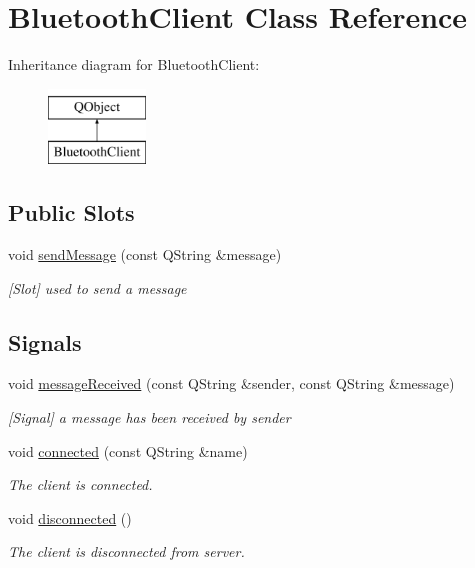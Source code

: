 \hypertarget{classBluetoothClient}{}\section{Bluetooth\+Client Class Reference}
\label{classBluetoothClient}
Inheritance diagram for Bluetooth\+Client\+:\begin{figure}[H]
\begin{center}
\leavevmode
\includegraphics[height=2.000000cm]{classBluetoothClient}
\end{center}
\end{figure}
\subsection*{Public Slots}
\begin{DoxyCompactItemize}
\item 
void \hyperlink{classBluetoothClient_a698d488b94e8d0e866620130cf865aad}{send\+Message} (const Q\+String \&message)
\begin{DoxyCompactList}\small\item\em \mbox{[}Slot\mbox{]} used to send a message \end{DoxyCompactList}\end{DoxyCompactItemize}
\subsection*{Signals}
\begin{DoxyCompactItemize}
\item 
void \hyperlink{classBluetoothClient_a6cb91adb86f0a8ec6e378f721b6710a5}{message\+Received} (const Q\+String \&sender, const Q\+String \&message)
\begin{DoxyCompactList}\small\item\em \mbox{[}Signal\mbox{]} a message has been received by sender \end{DoxyCompactList}\item 
void \hyperlink{classBluetoothClient_ae1bc0e1cb03c8f3affb3cfb12a2aa328}{connected} (const Q\+String \&name)
\begin{DoxyCompactList}\small\item\em The client is connected. \end{DoxyCompactList}\item 
void \hyperlink{classBluetoothClient_a60a0cd485da3beee051c8fea6c788834}{disconnected} ()\hypertarget{classBluetoothClient_a60a0cd485da3beee051c8fea6c788834}{}\label{classBluetoothClient_a60a0cd485da3beee051c8fea6c788834}

\begin{DoxyCompactList}\small\item\em The client is disconnected from server. \end{DoxyCompactList}\end{DoxyCompactItemize}
